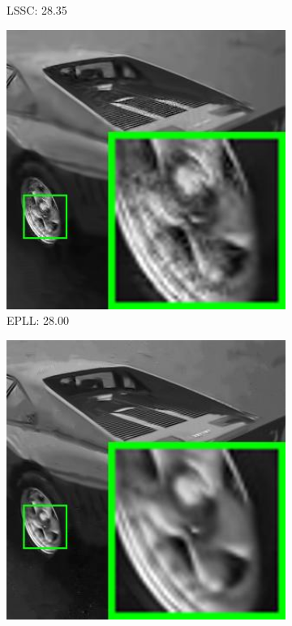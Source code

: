 \begin{figure}
\begin{subfigure}[t]{0.24\textwidth}
		\caption{LSSC: 28.35}
    \end{subfigure}
    \hfill
    \begin{subfigure}[t]{0.24\textwidth}
        \centering
        \includegraphics[width=1\textwidth]{images/pgpd/200img/br_NCSR_40_29030.jpg}
		\caption{EPLL: 28.00}
    \end{subfigure}
    \hfill
    \begin{subfigure}[t]{0.24\textwidth}
        \centering
        \includegraphics[width=1\textwidth]{images/pgpd/200img/br_WNNM_40_29030.jpg}

\end{subfigure}
\end{figure}
